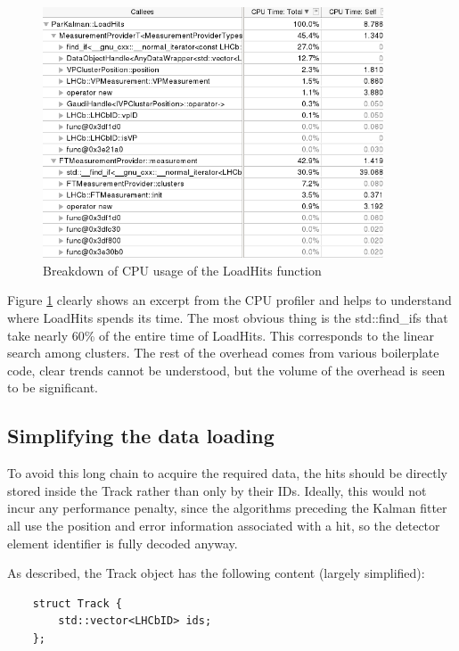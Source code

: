 \documentclass[12pt]{article}
\begin{document}
\begin{figure}[H]
	\begin{center}
		\includegraphics[width=0.9\textwidth]{kalmanfit_loadhits_breakdown}
	\end{center}
	\caption{Breakdown of CPU usage of the LoadHits function}
	\label{fig_kalmanfit_loadhits_breakdown}
\end{figure}

Figure \ref{fig_kalmanfit_loadhits_breakdown} clearly shows an excerpt from the CPU profiler and helps to understand where LoadHits spends its time. The most obvious thing is the std::find\_ifs that take nearly 60\% of the entire time of LoadHits. This corresponds to the linear search among clusters. The rest of the overhead comes from various boilerplate code, clear trends cannot be understood, but the volume of the overhead is seen to be significant.

\subsection{Simplifying the data loading}

To avoid this long chain to acquire the required data, the hits should be directly stored inside the Track rather than only by their IDs. Ideally, this would not incur any performance penalty, since the algorithms preceding the Kalman fitter all use the position and error information associated with a hit, so the detector element identifier is fully decoded anyway.

As described, the Track object has the following content (largely simplified):
\begin{lstlisting}
	struct Track {
		std::vector<LHCbID> ids;
	};
\end{lstlisting}
\end{document}
